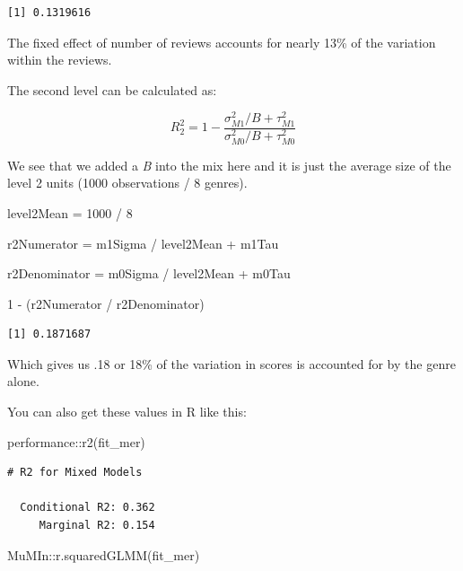 \documentclass[
  letterpaper,
]{krantz}
\newenvironment{Shaded}{}{}
\newcommand{\DecValTok}[1]{\textcolor[rgb]{0.25,0.63,0.44}{#1}}
\newcommand{\FunctionTok}[1]{\textcolor[rgb]{0.02,0.16,0.49}{#1}}
\newcommand{\NormalTok}[1]{#1}
\newcommand{\OtherTok}[1]{\textcolor[rgb]{0.00,0.44,0.13}{#1}}
\newcommand{\SpecialCharTok}[1]{\textcolor[rgb]{0.25,0.44,0.63}{#1}}
\begin{document}
\begin{verbatim}
[1] 0.1319616
\end{verbatim}

The fixed effect of number of reviews accounts for nearly 13\% of the
variation within the reviews.

The second level can be calculated as:

\[R^2_2 = 1 - \frac{\sigma^2_{M1} / B + \tau^2_{M1}}{\sigma^2_{M0} / B + \tau^2_{M0}}\]

We see that we added a \emph{B} into the mix here and it is just the
average size of the level 2 units (1000 observations / 8 genres).

\begin{Shaded}
\begin{Highlighting}[]
\NormalTok{level2Mean }\OtherTok{=} \DecValTok{1000} \SpecialCharTok{/} \DecValTok{8}

\NormalTok{r2Numerator }\OtherTok{=}\NormalTok{ m1Sigma }\SpecialCharTok{/}\NormalTok{ level2Mean }\SpecialCharTok{+}\NormalTok{ m1Tau}

\NormalTok{r2Denominator }\OtherTok{=}\NormalTok{ m0Sigma }\SpecialCharTok{/}\NormalTok{ level2Mean }\SpecialCharTok{+}\NormalTok{ m0Tau}

\DecValTok{1} \SpecialCharTok{{-}}\NormalTok{ (r2Numerator }\SpecialCharTok{/}\NormalTok{ r2Denominator)}
\end{Highlighting}
\end{Shaded}

\begin{verbatim}
[1] 0.1871687
\end{verbatim}

Which gives us .18 or 18\% of the variation in scores is accounted for
by the genre alone.

You can also get these values in R like this:

\begin{Shaded}
\begin{Highlighting}[]
\NormalTok{performance}\SpecialCharTok{::}\FunctionTok{r2}\NormalTok{(fit\_mer)}
\end{Highlighting}
\end{Shaded}

\begin{verbatim}
# R2 for Mixed Models

  Conditional R2: 0.362
     Marginal R2: 0.154
\end{verbatim}

\begin{Shaded}
\begin{Highlighting}[]
\NormalTok{MuMIn}\SpecialCharTok{::}\FunctionTok{r.squaredGLMM}\NormalTok{(fit\_mer)}
\end{Highlighting}
\end{Shaded}
\end{document}
